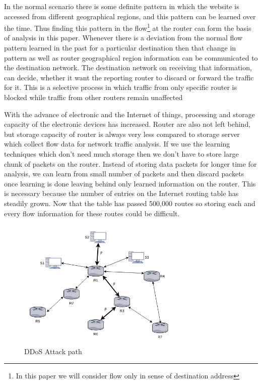\documentclass[10pt,oneside,a4paper]{article}
\begin{document}
In the normal scenario there is some definite pattern in which the website is accessed from different geographical regions, and this pattern can be learned over the time. Thus finding this pattern in the flow\footnote{In this paper we will consider flow only in sense of destination address} at the router can form the basis of analysis in this paper. Whenever there is a deviation from the normal flow pattern learned in the past for a particular destination then that change in pattern as well as router geographical region information can be communicated to the destination network. The destination network on receiving that information, can decide, whether it want the reporting router to discard or forward the traffic for it. This is a selective process in which traffic from only specific router is blocked while traffic from other routers remain unaffected\par

With the advance of electronic and the Internet of things, processing and storage capacity of the electronic devices has increased. Router are also not left behind, but storage capacity of router is always very less compared to storage server which collect flow data for network traffic analysis. If we use the learning techniques which don't need much storage then we don't have to store large chunk of packets on the router. Instead of storing data packets for longer time for analysis, we can learn from small number of packets and then discard packets once learning is done leaving behind only learned information on the router. This is necessary because the number of entries on the Internet routing table has steadily grown. Now that the table has passed 500,000 routes\cite{routing-tablesize} so storing each and every flow information for these routes could be difficult.\par

\begin{figure}[H]
\centering
\includegraphics[width=0.70\textwidth]{RouterCommunication.png}
\caption{DDoS Attack path} \label{fig:attackpath}
\end{figure}
\end{document}
